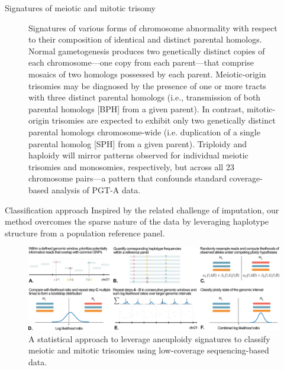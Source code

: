 \documentclass[final]{beamer}
\newlength{\colwidth}
\begin{document}
\begin{frame}[t]
\begin{columns}[t]
\begin{column}{\colwidth}
\begin{block}{Signatures of meiotic and mitotic trisomy}
\begin{figure}
      \caption{Signatures of various forms of chromosome abnormality with respect to their composition of identical and distinct parental homologs. Normal gametogenesis produces two genetically distinct copies of each chromosome---one copy from each parent---that comprise mosaics of two homologs possessed by each parent. Meiotic-origin trisomies may be diagnosed by the presence of one or more tracts with three distinct parental homologs (i.e., transmission of both parental homologs [BPH] from a given parent). In contrast, mitotic-origin trisomies are expected to exhibit only two genetically distinct parental homologs chromosome-wide (i.e. duplication of a single parental homolog [SPH] from a given parent). Triploidy and haploidy will mirror patterns observed for individual meiotic trisomies and monosomies, respectively, but across all 23 chromosome pairs---a pattern that confounds standard coverage-based analysis of PGT-A data.}
    \end{figure}
    
  \end{block}

  \begin{block}{Classification approach}
      Inspired by the related challenge of imputation, our method overcomes the sparse nature of the data by leveraging haplotype structure from a population reference panel. 
  \begin{figure}
      \centering
     \includegraphics[width=\linewidth]{figures/fig2.pdf}

      \caption{A statistical approach to leverage aneuploidy signatures to classify meiotic and mitotic trisomies using low-coverage sequencing-based data. }
    \end{figure}
         

\end{block}
\end{column}
\end{columns}
\end{frame}
\end{document}
